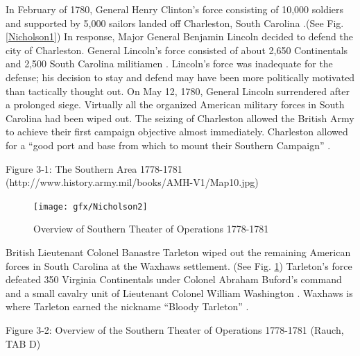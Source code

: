 In February of 1780, General Henry Clinton’s force consisting of 10,000 soldiers
and supported by 5,000 sailors landed off Charleston, South Carolina
\cite[p.6]{weigley_partisan_1970}.(See Fig. \ref{Nicholson1})
In response, Major General Benjamin Lincoln decided to defend the city of
Charleston.  General Lincoln’s force consisted of about 2,650 Continentals and
2,500 South Carolina militiamen \cite[p.6]{weigley_partisan_1970}.  Lincoln’s
force was inadequate for the defense; his decision to stay and defend may have
been more politically motivated than tactically thought out.  On May 12, 1780,
General Lincoln surrendered after a prolonged siege.  Virtually all the
organized American military forces in South Carolina had been wiped out.  The
seizing of Charleston allowed the British Army to achieve their first campaign
objective almost immediately.  Charleston allowed for a “good port and base from
which to mount their Southern Campaign” \cite[p.22]{woodward_comparative_2002}.


Figure 3-1: The Southern Area 1778-1781
(http://www.history.army.mil/books/AMH-V1/Map10.jpg)


\begin{figure}[ht]
\begin{center}
\texttt{[image: gfx/Nicholson2]}
\end{center}
\caption{Overview of Southern Theater of Operations 1778-1781 \cite[Tab D, Map 1]{rauch_battle_2007}}
\label{Nicholson2}
\end{figure}

British Lieutenant Colonel Banastre Tarleton wiped out the remaining American
forces in South Carolina at the Waxhaws settlement.  (See Fig. \ref{Nicholson2})
Tarleton’s force defeated 350 Virginia Continentals under Colonel Abraham
Buford’s command and a small cavalry unit of Lieutenant Colonel William
Washington \cite[p.7]{weigley_partisan_1970}.  Waxhaws is where Tarleton earned the nickname
“Bloody Tarleton” \cite[p.20]{moncure_cowpens_1996}.

Figure 3-2: Overview of the Southern Theater of Operations 1778-1781 (Rauch, TAB D)


